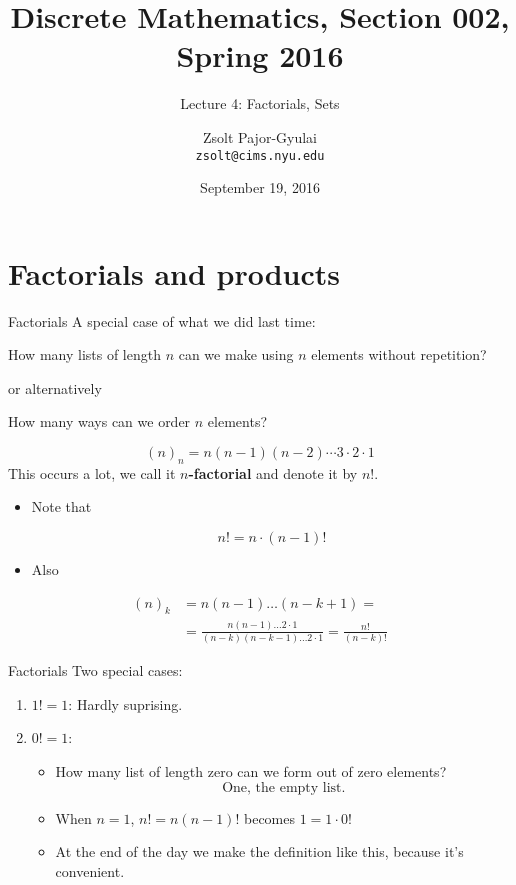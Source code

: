 \documentclass{beamer}
\title{Discrete Mathematics, Section 002, Spring 2016}
\subtitle{Lecture 4: Factorials, Sets}
\author[Zsolt]{Zsolt Pajor-Gyulai \\ \texttt{zsolt@cims.nyu.edu}}
\date{September 19, 2016}
\institute[NYU] 
{
\normalsize Courant Institute of Mathematical Sciences
}
\def\bl[#1]#2{\begin{block}{#1}#2\end{block}}
\def\itemb{\begin{itemize}}
\def\iteme{\end{itemize}}
\begin{document}
\begin{frame}
  \titlepage
\end{frame}



\section{Factorials and products}

\begin{frame}{Factorials}
A special case of what we did last time:
\begin{block}{}
How many lists of length $n$ can we make using $n$ elements without repetition?
\end{block}
or alternatively
\begin{block}{}
How many ways can we order $n$ elements?\pause
\end{block}
\[
(n)_n=n(n-1)(n-2)\cdots 3\cdot 2\cdot 1
\]\pause
This occurs a lot, we call it \textbf{$n$-factorial} and denote it by $n!$.
\pause
\end{frame}
\begin{frame}
\itemb
\item Note that
\bl[]{
\[
n!=n\cdot (n-1)!
\]}
\item Also
\iteme
\bl[]{\vspace{-0.3cm}
\begin{align*}
(n)_k&=n(n-1)\dots (n-k+1)=\\
&=\frac{n(n-1)\dots 2\cdot 1}{(n-k)(n-k-1)\dots 2\cdot 1}=\frac{n!}{(n-k)!}
\end{align*}}

\end{frame}

\begin{frame}{Factorials}
Two special cases:
\begin{enumerate}
\item $1!=1$: Hardly suprising.\pause
\item $0!=1$:\pause
\begin{itemize}
\item How many list of length zero can we form out of zero elements?
\[
\textrm{One, the empty list.}
\]\pause
\item When $n=1$, $n!=n(n-1)!$ becomes $1=1\cdot 0!$\pause
\item At the end of the day we make the definition like this, because it's convenient.
\end{itemize}
\end{enumerate}
\end{frame}
\end{document}
